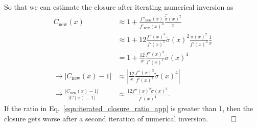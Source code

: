\noindent So that we can estimate the closure after iterating numerical inversion as
\begin{align}
C_\text{new}(x) &\approx 1+\frac{f''_\text{new}(x)}{f'_\text{new}(x)^3}\frac{\hat{\tilde{\sigma}}(x)^2}{x}\nonumber\\
&\approx 1+12\frac{f''(x)^3}{f'(x)^5}\tilde{\sigma}(x)^2\frac{\tilde{\sigma}(x)^2}{f'(x)^2}\frac{1}{x}\nonumber\\
&=1+\frac{12}{x}\frac{f''(x)^3}{f'(x)^7}\tilde{\sigma}(x)^4\\
\rightarrow |C_\text{new}(x)-1| &\approx \left|\frac{12}{x}\frac{f''(x)^3}{f'(x)^7}\tilde{\sigma}(x)^4\right|\\
\rightarrow \frac{|C_\text{new}(x)-1|}{|C(x)-1|} &\approx \frac{12f''(x)^2\tilde{\sigma}(x)^2}{f'(x)^4}.\label{eqn:iterated_closure_ratio_app}
\end{align}
If the ratio in Eq.~\ref{eqn:iterated_closure_ratio_app} is greater than 1, then the closure gets worse after a second iteration of numerical inversion. $\hspace{1 cm} \Box$


